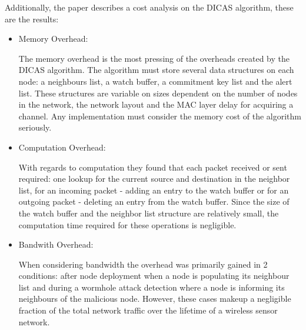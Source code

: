 Additionally, the paper describes a cost analysis on the DICAS algorithm, these are the results: 
\begin{itemize}
\item Memory Overhead:

The memory overhead is the most pressing of the overheads created by the DICAS algorithm. The algorithm must store several data structures on each node: a neighbours list, a watch buffer, a commitment key list and the alert list. These structures are variable on sizes dependent on the number of nodes in the network, the network layout and the MAC layer delay for acquiring a channel. Any implementation must consider the memory cost of the algorithm seriously.

\item Computation Overhead:

With regards to computation they found that each packet received or sent required: one lookup for the current source and destination in the neighbor list, for an incoming packet - adding an entry to the watch buffer or for an outgoing packet - deleting an entry from the watch buffer. Since the size of the watch buffer and the neighbor list structure are relatively small, the computation time required for these operations is negligible.

\item Bandwith Overhead:

When considering bandwidth the overhead was primarily gained in 2 conditions: after node deployment when a node is populating its neighbour list and during a wormhole attack detection where a node is informing its neighbours of the malicious node. However, these cases makeup a negligible fraction of the total network traffic over the lifetime of a wireless sensor network.
\end{itemize}

